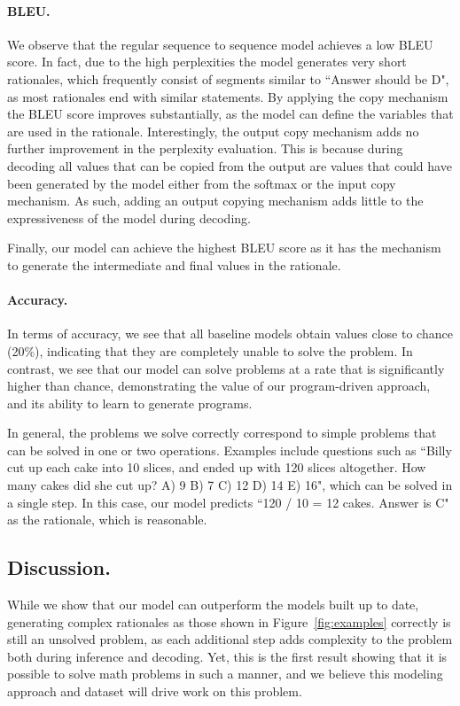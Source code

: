 \paragraph{BLEU.}
We observe that the regular sequence to sequence model achieves a low BLEU score. In fact, due to the high perplexities the model generates very short rationales, which frequently consist of segments similar to ``Answer should be D", as most rationales end with similar statements. By applying the copy mechanism the BLEU score improves substantially, as the model can define the variables that are used in the rationale. Interestingly, the output copy mechanism adds no further improvement in the perplexity evaluation. This is because during decoding all values that can be copied from the output are values that could have been generated by the model either from the softmax or the input copy mechanism. As such, adding an output copying mechanism adds little to the expressiveness of the model during decoding.

Finally, our model can achieve the highest BLEU score as it has the mechanism to generate the intermediate and final values in the rationale.

\paragraph{Accuracy.}
In terms of accuracy, we see that all baseline models obtain values close to chance (20\%), indicating that they are completely unable to solve the problem. In contrast, we see that our model can solve problems at a rate that is significantly higher than chance, demonstrating the value of our program-driven approach, and its ability to learn to generate programs.

In general, the problems we solve correctly correspond to simple problems that can be solved in one or two operations. Examples include questions such as ``Billy cut up each cake into 10 slices, and ended up with 120 slices altogether. How many cakes did she cut up? A) 9 B) 7 C) 12 D) 14 E) 16", which can be solved in a single step. In this case, our model predicts ``120 / 10 = 12 cakes. Answer is C" as the rationale, which is reasonable.

\subsection{Discussion.}
While we show that our model can outperform the models built up to date, generating complex rationales as those shown in Figure~\ref{fig:examples} correctly is still an unsolved problem, as each additional step adds complexity to the problem both during inference and decoding. Yet, this is the first result showing that it is possible to solve math problems in such a manner, and we believe this modeling approach and dataset will drive work on this problem.

